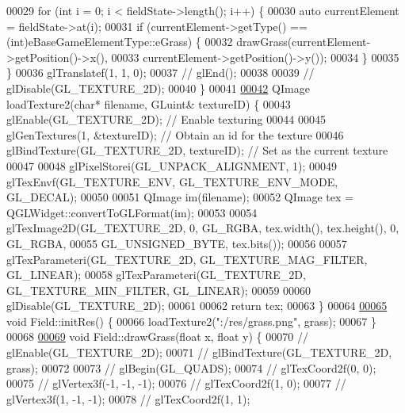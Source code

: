 \begin{DoxyCode}
00029   \textcolor{keywordflow}{for} (\textcolor{keywordtype}{int} i = 0; i < fieldState->length(); i++) \{
00030     \textcolor{keyword}{auto} currentElement = fieldState->at(i);
00031     \textcolor{keywordflow}{if} (currentElement->getType() == (\textcolor{keywordtype}{int})eBaseGameElementType::eGrass) \{
00032       drawGrass(currentElement->getPosition()->x(),
00033                 currentElement->getPosition()->y());
00034     \}
00035   \}
00036   glTranslatef(1, 1, 0);
00037   \textcolor{comment}{//  glEnd();}
00038 
00039   \textcolor{comment}{//  glDisable(GL\_TEXTURE\_2D);}
00040 \}
00041 
\hyperlink{a00071_a9661f3e3f0b4301dd53d9588fcdbfc04}{00042} QImage loadTexture2(\textcolor{keywordtype}{char}* filename, GLuint& textureID) \{
00043   glEnable(GL\_TEXTURE\_2D);  \textcolor{comment}{// Enable texturing}
00044 
00045   glGenTextures(1, &textureID);             \textcolor{comment}{// Obtain an id for the texture}
00046   glBindTexture(GL\_TEXTURE\_2D, textureID);  \textcolor{comment}{// Set as the current texture}
00047 
00048   glPixelStorei(GL\_UNPACK\_ALIGNMENT, 1);
00049   glTexEnvf(GL\_TEXTURE\_ENV, GL\_TEXTURE\_ENV\_MODE, GL\_DECAL);
00050 
00051   QImage im(filename);
00052   QImage tex = QGLWidget::convertToGLFormat(im);
00053 
00054   glTexImage2D(GL\_TEXTURE\_2D, 0, GL\_RGBA, tex.width(), tex.height(), 0, GL\_RGBA,
00055                GL\_UNSIGNED\_BYTE, tex.bits());
00056 
00057   glTexParameteri(GL\_TEXTURE\_2D, GL\_TEXTURE\_MAG\_FILTER, GL\_LINEAR);
00058   glTexParameteri(GL\_TEXTURE\_2D, GL\_TEXTURE\_MIN\_FILTER, GL\_LINEAR);
00059 
00060   glDisable(GL\_TEXTURE\_2D);
00061 
00062   \textcolor{keywordflow}{return} tex;
00063 \}
00064 
\hyperlink{a00173_ac2d8f10e9bccfe3cf51cf534c73cecd4}{00065} \textcolor{keywordtype}{void} Field::initRes() \{
00066   loadTexture2(\textcolor{stringliteral}{":/res/grass.png"}, grass);
00067 \}
00068 
\hyperlink{a00173_a05becf8069f37b0529b691fcdd1ca8f1}{00069} \textcolor{keywordtype}{void} Field::drawGrass(\textcolor{keywordtype}{float} x, \textcolor{keywordtype}{float} y) \{
00070   \textcolor{comment}{//  glEnable(GL\_TEXTURE\_2D);}
00071   \textcolor{comment}{//  glBindTexture(GL\_TEXTURE\_2D, grass);}
00072 
00073   \textcolor{comment}{//  glBegin(GL\_QUADS);}
00074   \textcolor{comment}{//  glTexCoord2f(0, 0);}
00075   \textcolor{comment}{//  glVertex3f(-1, -1, -1);}
00076   \textcolor{comment}{//  glTexCoord2f(1, 0);}
00077   \textcolor{comment}{//  glVertex3f(1, -1, -1);}
00078   \textcolor{comment}{//  glTexCoord2f(1, 1);}

\end{DoxyCode}
